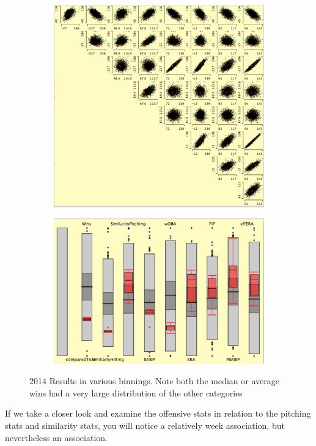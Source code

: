 \documentclass[12pt]{article}
\numberwithin{equation}{subsection}
\begin{document}
\begin{figure}[H] 
  \begin{subfigure}[b]{0.5\linewidth}
    \centering
    \includegraphics[width=0.7\linewidth]{h5} 
    \captionsetup{justification=centering}
    \label{fig2:a} 
    \vspace{4ex}
  \end{subfigure}%
  \begin{subfigure}[b]{0.5\linewidth}
    \centering
    \includegraphics[width=0.9\linewidth]{h6} 
    \captionsetup{justification=centering}
    \label{fig2:b} 
    \vspace{4ex}
  \end{subfigure} 
  \caption{2014 Results in various binnings. Note both the median or average wins had a very large distribution of the other categories}
\end{figure}

If we take a closer look and examine the offensive stats in relation to the pitching stats and similarity stats, you will notice a relatively week association, but nevertheless an association.
\end{document}

